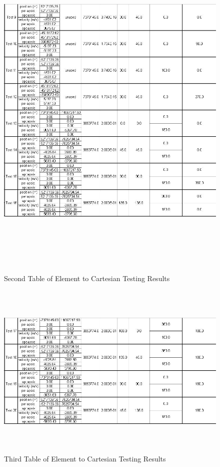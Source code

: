 \begin{description}
\begin{figure}[h]
\begin{center}
\includegraphics[height=170mm]{JPGfiles/orb_deconvert2.jpg}
\caption{Second Table of Element to Cartesian Testing Results}
\label{ele_to_car2}
\end{center}
\end{figure}

\begin{figure}[h]
\begin{center}
\includegraphics[height=85mm]{JPGfiles/orb_deconvert3.jpg}
\caption{Third Table of Element to Cartesian Testing Results}
\label{ele_to_car3}
\end{center}
\end{figure}


\end{description}
